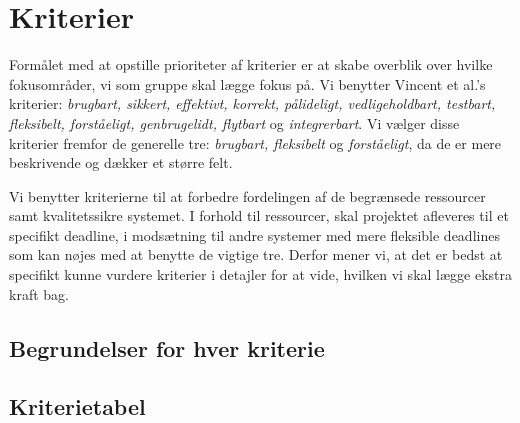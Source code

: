 \section{Kriterier}

Formålet med at opstille prioriteter af kriterier er at skabe overblik over hvilke fokusområder, vi som gruppe skal lægge fokus på. Vi benytter Vincent et al.'s \cite{crit} kriterier: \emph{brugbart, sikkert, effektivt, korrekt, pålideligt, vedligeholdbart, testbart, fleksibelt, forståeligt, genbrugelidt, flytbart} og \emph{integrerbart}. Vi vælger disse kriterier fremfor de generelle tre: \emph{brugbart, fleksibelt} og \emph{forståeligt}, da de er mere beskrivende og dækker et større felt.

Vi benytter kriterierne til at forbedre fordelingen af de begrænsede ressourcer samt kvalitetssikre systemet. I forhold til ressourcer, skal projektet afleveres til et specifikt deadline, i modsætning til andre systemer med mere fleksible deadlines som kan nøjes med at benytte de vigtige tre. Derfor mener vi, at det er bedst at specifikt kunne vurdere kriterier i detajler for at vide, hvilken vi skal lægge ekstra kraft bag.

\subsection{Begrundelser for hver kriterie}


\subsection{Kriterietabel}


